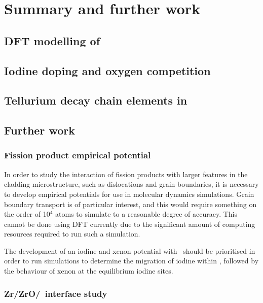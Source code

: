 \chapter{Summary and further work}

\label{ch:summary}

\section{DFT modelling of \zirconia}

\section{Iodine doping and oxygen competition}

\section{Tellurium decay chain elements in \zirconia}

\section{Further work}

\subsection{Fission product empirical potential}

In order to study the interaction of fission products with larger features in the cladding microstructure, such as dislocations and grain boundaries, it is necessary to develop empirical potentials for use in molecular dynamics simulations. Grain boundary transport is of particular interest, and this would require something on the order of 10$^{4}$ atoms to simulate to a reasonable degree of accuracy. This cannot be done using DFT currently due to the significant amount of computing resources required to run such a simulation. 

The development of an iodine and xenon potential with \zirconia\ should be prioritised in order to run simulations to determine the migration of iodine within \zirconia, followed by the behaviour of xenon at the equilibrium iodine sites.

\subsection{Zr/ZrO/\zirconia\ interface study}

